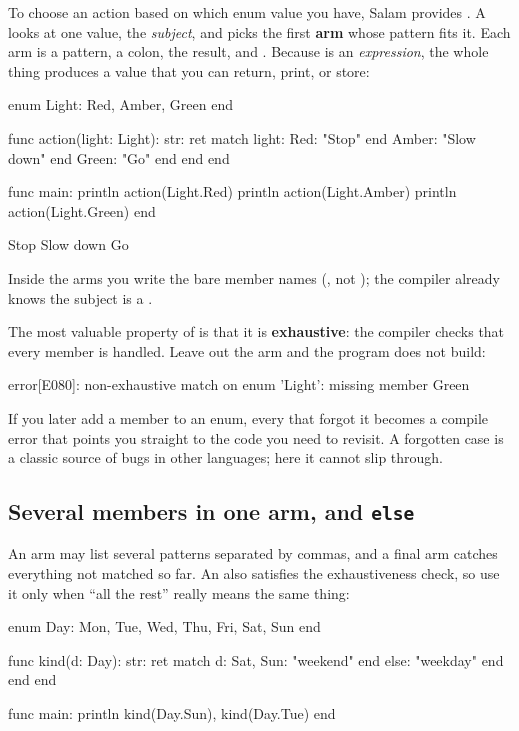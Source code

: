 To choose an action based on which enum value you have, Salam provides
. A  looks at one value, the \emph{subject}, and picks the
first \textbf{arm} whose pattern fits it. Each arm is a pattern, a colon, the
result, and . Because  is an \emph{expression}, the whole
thing produces a value that you can return, print, or store:

\begin{salamen}
enum Light: Red, Amber, Green end

func action(light: Light): str:
    ret match light:
        Red: "Stop" end
        Amber: "Slow down" end
        Green: "Go" end
    end
end

func main:
    println action(Light.Red)
    println action(Light.Amber)
    println action(Light.Green)
end
\end{salamen}

\begin{progout}
Stop
Slow down
Go
\end{progout}

Inside the arms you write the bare member names (, not
); the compiler already knows the subject is a .

The most valuable property of  is that it is \textbf{exhaustive}: the
compiler checks that every member is handled. Leave out the  arm and
the program does not build:

\begin{shell}
error[E080]: non-exhaustive match on enum 'Light': missing member Green
\end{shell}

If you later add a member to an enum, every  that forgot it becomes a
compile error that points you straight to the code you need to revisit. A
forgotten case is a classic source of bugs in other languages; here it cannot
slip through.

\subsection{Several members in one arm, and \texttt{else}}

An arm may list several patterns separated by commas, and a final 
arm catches everything not matched so far. An  also satisfies the
exhaustiveness check, so use it only when ``all the rest'' really means the same
thing:

\begin{salamen}
enum Day: Mon, Tue, Wed, Thu, Fri, Sat, Sun end

func kind(d: Day): str:
    ret match d:
        Sat, Sun: "weekend" end
        else: "weekday" end
    end
end

func main:
    println kind(Day.Sun), kind(Day.Tue)
end
\end{salamen}

